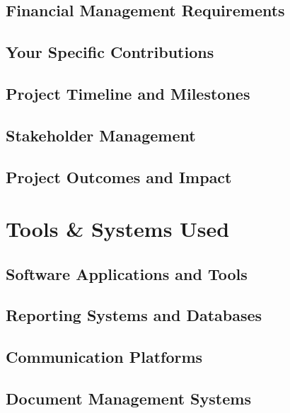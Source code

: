 \subsection{Financial Management Requirements}

\subsection{Your Specific Contributions}

\subsection{Project Timeline and Milestones}

\subsection{Stakeholder Management}

\subsection{Project Outcomes and Impact}

\section{Tools \& Systems Used}

\subsection{Software Applications and Tools}

\subsection{Reporting Systems and Databases}

\subsection{Communication Platforms}

\subsection{Document Management Systems}

